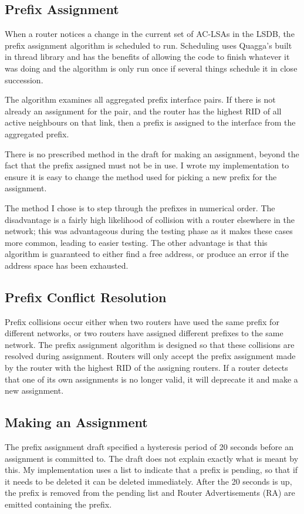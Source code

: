 \documentclass[12pt,a4paper,twoside]{report}
\begin{document}
\subsection{Prefix Assignment}
When a router notices a change in the current set of AC-LSAs in the LSDB, the
prefix assignment algorithm is scheduled to run. Scheduling uses Quagga's built
in thread library and has the benefits of allowing the code to finish whatever
it was doing and the algorithm is only run once if several things schedule it
in close succession.

The algorithm examines all aggregated prefix interface pairs. If
there is not already an assignment for the pair, and the router has the
highest RID of all active neighbours on that link, then a
prefix is assigned to the interface from the aggregated prefix. 

There is no prescribed method in the draft for making an assignment, beyond the
fact that the prefix assigned must not be in use. I wrote my implementation to
ensure it is easy to change the method used for picking a new prefix for the
assignment. 

The method I chose is to step through the prefixes in numerical order. The
disadvantage is a fairly high likelihood of collision with a router elsewhere
in the network; this was advantageous during the testing phase as it makes
these cases more common, leading to easier testing. The other advantage is that
this algorithm is guaranteed to either find a free address, or produce an error
if the address space has been exhausted. 

\subsection{Prefix Conflict Resolution}
Prefix collisions occur either when two routers have used the same prefix for
different networks, or two routers have assigned different prefixes to the
same network. The prefix assignment algorithm is designed so that these
collisions are resolved during assignment. Routers will only accept the prefix
assignment made by the router with the highest RID of the assigning routers. If
a router detects that one of its own assignments is no longer valid, it will
deprecate it and make a new assignment. 

\subsection{Making an Assignment}
\label{pending_list}
The prefix assignment draft specified a hysteresis period of 20 seconds
before an assignment is committed to. The draft does not explain exactly what
is meant by this. My implementation uses a list to indicate that a prefix is
pending, so that if it needs to be deleted it can be deleted immediately. After
the 20 seconds is up, the prefix is removed from the pending list and Router
Advertisements (RA) are emitted containing the prefix.
 
\end{document}
